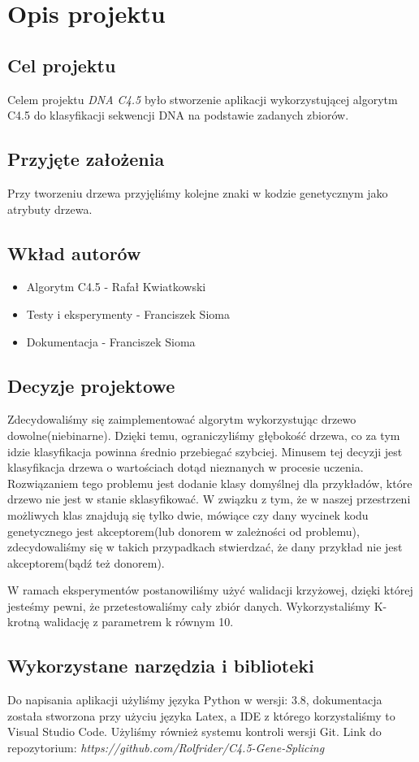 \section{Opis projektu}
\subsection{Cel projektu}


Celem projektu {\it DNA C4.5} było stworzenie aplikacji wykorzystującej algorytm C4.5 do klasyfikacji sekwencji DNA na podstawie zadanych zbiorów. 

\subsection{Przyjęte założenia}
Przy tworzeniu drzewa przyjęliśmy kolejne znaki w kodzie genetycznym jako atrybuty drzewa.
\subsection{Wkład autorów}
\begin{itemize}
    \item Algorytm C4.5 - Rafał Kwiatkowski
    \item Testy i eksperymenty - Franciszek Sioma
    \item Dokumentacja - Franciszek Sioma
\end{itemize}
\subsection{Decyzje projektowe}


Zdecydowaliśmy się zaimplementować algorytm wykorzystując drzewo dowolne(niebinarne). Dzięki temu, ograniczyliśmy głębokość drzewa, co za tym idzie klasyfikacja powinna średnio przebiegać szybciej.
Minusem tej decyzji jest klasyfikacja drzewa o wartościach dotąd nieznanych w procesie uczenia. Rozwiązaniem tego problemu jest dodanie klasy domyślnej dla przykładów, które drzewo nie jest w stanie sklasyfikować. W związku z tym, że w naszej przestrzeni możliwych klas znajdują się tylko dwie, mówiące czy dany wycinek kodu genetycznego jest akceptorem(lub donorem w zależności od problemu), zdecydowaliśmy się w takich przypadkach stwierdzać, że dany przykład nie jest akceptorem(bądź też donorem). 

W ramach eksperymentów postanowiliśmy użyć walidacji krzyżowej, dzięki której jesteśmy pewni, że przetestowaliśmy cały zbiór danych. Wykorzystaliśmy K-krotną walidację z parametrem k równym 10.
\subsection{Wykorzystane narzędzia i biblioteki}


Do napisania aplikacji użyliśmy języka Python w wersji: 3.8, dokumentacja została stworzona przy użyciu języka Latex, a IDE z którego korzystaliśmy to Visual Studio Code. Użyliśmy również systemu kontroli wersji Git.
Link do repozytorium: {\it https://github.com/Rolfrider/C4.5-Gene-Splicing}
